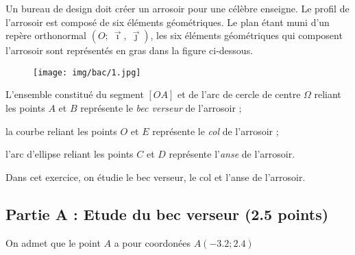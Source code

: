 \documentclass[answers]{exam}
\begin{document}
Un bureau de design doit créer un arrosoir pour une célèbre enseigne. Le profil de l'arrosoir est composé de six éléments géométriques. Le plan étant muni d'un repère orthonormal
$\left(O\mathpunct{} ; \ \overrightarrow{\imath}\mathpunct{},\ \overrightarrow{\jmath}\right)\mathpunct{}$, les six éléments géométriques qui composent l'arrosoir sont représentés en gras
dans la figure ci-dessous.

\begin{figure}[H]
  \centering
  \texttt{[image: img/bac/1.jpg]}
\end{figure}

\begin{compactitem}
  \item L'ensemble constitué du segment \([OA]\) et de l'arc de cercle de
        centre \(\Omega\) reliant les points \(A\) et \(B\) représente
        le \emph{bec verseur} de l'arrosoir ;
  \item la courbe reliant les points \(O\) et \(E\) représente le
        \emph{col} de l'arrosoir ;
  \item l'arc d'ellipse reliant les points \(C\) et \(D\) représente
        l'\emph{anse} de l'arrosoir.
\end{compactitem}

Dans cet exercice, on étudie le bec verseur, le col et l'anse de l'arrosoir.

\subsection*{Partie A : Etude du bec verseur (2.5 points)}

On admet que le point $A$ a pour coordonées $A(-3.2 ; 2.4)$
\end{document}
